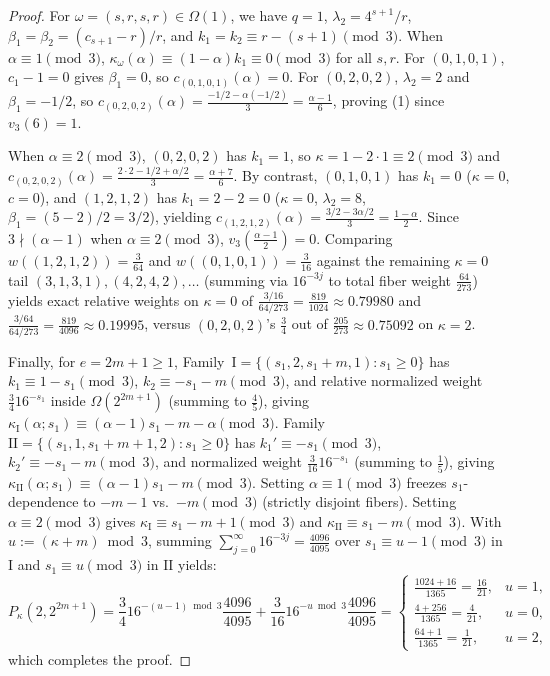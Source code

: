 \documentclass[11pt,a4paper]{article}
\numberwithin{equation}{section}
\theoremstyle{definition}
\theoremstyle{remark}
\begin{document}
\begin{proof}
For $\omega = (s, r, s, r) \in \Omega(1)$, we have $q = 1$, $\lambda_2 = 4^{s+1}/r$, $\beta_1 = \beta_2 = (c_{s+1}-r)/r$, and $k_1 = k_2 \equiv r - (s+1) \pmod 3$. When $\alpha \equiv 1 \pmod 3$, $\kappa_\omega(\alpha) \equiv (1-\alpha)k_1 \equiv 0 \pmod 3$ for all $s, r$. For $(0, 1, 0, 1)$, $c_{1} - 1 = 0$ gives $\beta_1 = 0$, so $c_{(0,1,0,1)}(\alpha) = 0$. For $(0, 2, 0, 2)$, $\lambda_2 = 2$ and $\beta_1 = -1/2$, so $c_{(0,2,0,2)}(\alpha) = \frac{-1/2 - \alpha(-1/2)}{3} = \frac{\alpha - 1}{6}$, proving (1) since $v_3(6) = 1$.

When $\alpha \equiv 2 \pmod 3$, $(0, 2, 0, 2)$ has $k_1 = 1$, so $\kappa = 1 - 2\cdot 1 \equiv 2 \pmod 3$ and $c_{(0,2,0,2)}(\alpha) = \frac{2\cdot 2 - 1/2 + \alpha/2}{3} = \frac{\alpha + 7}{6}$. By contrast, $(0, 1, 0, 1)$ has $k_1 = 0$ ($\kappa = 0$, $c = 0$), and $(1, 2, 1, 2)$ has $k_1 = 2 - 2 = 0$ ($\kappa = 0$, $\lambda_2 = 8$, $\beta_1 = (5-2)/2 = 3/2$), yielding $c_{(1,2,1,2)}(\alpha) = \frac{3/2 - 3\alpha/2}{3} = \frac{1-\alpha}{2}$. Since $3 \nmid (\alpha - 1)$ when $\alpha \equiv 2 \pmod 3$, $v_3(\frac{\alpha-1}{2}) = 0$. Comparing $w((1,2,1,2)) = \frac{3}{64}$ and $w((0,1,0,1)) = \frac{3}{16}$ against the remaining $\kappa=0$ tail $(3,1,3,1), (4,2,4,2), \dots$ (summing via $16^{-3j}$ to total fiber weight $\frac{64}{273}$) yields exact relative weights on $\kappa = 0$ of $\frac{3/16}{64/273} = \frac{819}{1024} \approx 0.79980$ and $\frac{3/64}{64/273} = \frac{819}{4096} \approx 0.19995$, versus $(0,2,0,2)$'s $\frac{3}{4}$ out of $\frac{205}{273} \approx 0.75092$ on $\kappa = 2$.

Finally, for $e = 2m + 1 \ge 1$, Family~$\mathrm{I} = \{(s_1, 2, s_1 + m, 1) : s_1 \ge 0\}$ has $k_1 \equiv 1 - s_1 \pmod 3$, $k_2 \equiv -s_1 - m \pmod 3$, and relative normalized weight $\frac{3}{4} 16^{-s_1}$ inside $\Omega(2^{2m+1})$ (summing to $\frac{4}{5}$), giving $\kappa_{\mathrm{I}}(\alpha; s_1) \equiv (\alpha - 1)s_1 - m - \alpha \pmod 3$. Family~$\mathrm{II} = \{(s_1, 1, s_1 + m + 1, 2) : s_1 \ge 0\}$ has $k_1' \equiv -s_1 \pmod 3$, $k_2' \equiv -s_1 - m \pmod 3$, and normalized weight $\frac{3}{16} 16^{-s_1}$ (summing to $\frac{1}{5}$), giving $\kappa_{\mathrm{II}}(\alpha; s_1) \equiv (\alpha - 1)s_1 - m \pmod 3$. Setting $\alpha \equiv 1 \pmod 3$ freezes $s_1$-dependence to $-m - 1$ vs.\ $-m \pmod 3$ (strictly disjoint fibers). Setting $\alpha \equiv 2 \pmod 3$ gives $\kappa_{\mathrm{I}} \equiv s_1 - m + 1 \pmod 3$ and $\kappa_{\mathrm{II}} \equiv s_1 - m \pmod 3$. With $u := (\kappa + m) \bmod 3$, summing $\sum_{j=0}^\infty 16^{-3j} = \frac{4096}{4095}$ over $s_1 \equiv u - 1 \pmod 3$ in $\mathrm{I}$ and $s_1 \equiv u \pmod 3$ in $\mathrm{II}$ yields:
\[
P_{\kappa}(2, 2^{2m+1}) = \frac{3}{4} 16^{-(u-1)\bmod 3}\frac{4096}{4095} + \frac{3}{16} 16^{-u\bmod 3}\frac{4096}{4095} =
\begin{cases}
\frac{1024+16}{1365} = \frac{16}{21}, & u = 1, \\[3pt]
\frac{4+256}{1365} = \frac{4}{21}, & u = 0, \\[3pt]
\frac{64+1}{1365} = \frac{1}{21}, & u = 2,
\end{cases}
\]
which completes the proof.
\end{proof}
\end{document}
